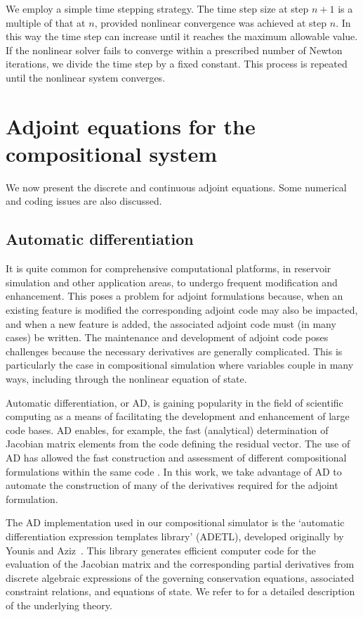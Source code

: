We employ a simple time stepping strategy. The time step size at step $n+1$ is a
multiple of that at $n$, provided nonlinear convergence was achieved at step
$n$. In this way the time step can increase until it reaches the maximum
allowable value. If the nonlinear solver fails to converge within a prescribed number
of Newton iterations, we divide the time step by a fixed constant. This process
is repeated until the nonlinear system converges.



\section{Adjoint equations for the compositional system} \label{sec:adjoint}
We now present the discrete and continuous adjoint equations. Some numerical and coding issues are also discussed.


\subsection{Automatic differentiation} \label{sec:autodiff}


It is quite common for comprehensive computational platforms, in reservoir
simulation and other application areas, to undergo frequent modification and enhancement. This poses a problem for adjoint formulations
because, when an existing feature is modified the corresponding adjoint code may
also be impacted, and when a new feature is added, the associated adjoint code
must (in many cases) be written. The maintenance and development of adjoint code
poses challenges because the necessary derivatives are generally complicated.
This is particularly the case in compositional simulation where variables couple
in many ways, including through the nonlinear equation of state.


Automatic differentiation, or AD, is gaining popularity in the field of
scientific computing as a means of facilitating the development and enhancement of large code bases. AD enables, for example, the fast (analytical) determination of Jacobian matrix elements from the code
defining the residual vector. The use of AD has allowed the fast construction
and assessment of different compositional formulations within the same code
\cite{Voskov_nonlinear:2009}. In this work, we take advantage of AD to automate
the construction of many of the derivatives required for the adjoint
formulation.


The AD implementation used in our compositional simulator is the `automatic
differentiation expression templates library' (ADETL), developed originally by
Younis and Aziz~\cite{Younis:2007}.  This library generates efficient computer
code for the evaluation of the Jacobian matrix and the corresponding partial
derivatives from discrete algebraic expressions of the governing conservation
equations, associated constraint relations, and equations of state. We refer to
\cite{Younis:2007} for a detailed description of the underlying theory.


